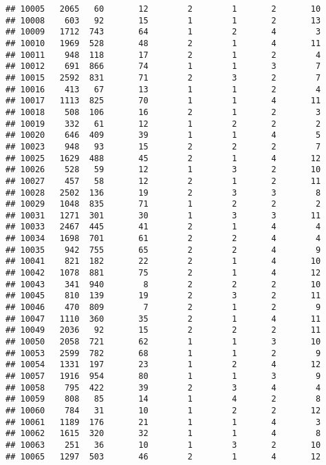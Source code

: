 \documentclass[]{article}
\begin{document}
\begin{verbatim}
## 10005   2065   60       12        2        1       2       10
## 10008    603   92       15        1        1       2       13
## 10009   1712  743       64        1        2       4        3
## 10010   1969  528       48        2        1       4       11
## 10011    948  118       17        2        1       2        4
## 10012    691  866       74        1        1       3        7
## 10015   2592  831       71        2        3       2        7
## 10016    413   67       13        1        1       2        4
## 10017   1113  825       70        1        1       4       11
## 10018    508  106       16        2        1       2        3
## 10019    332   61       12        1        2       2        2
## 10020    646  409       39        1        1       4        5
## 10023    948   93       15        2        2       2        7
## 10025   1629  488       45        2        1       4       12
## 10026    528   59       12        1        3       2       10
## 10027    457   58       12        2        1       2       11
## 10028   2502  136       19        2        3       3        8
## 10029   1048  835       71        1        2       2        2
## 10031   1271  301       30        1        3       3       11
## 10033   2467  445       41        2        1       4        4
## 10034   1698  701       61        2        2       4        4
## 10035    942  755       65        2        2       4        9
## 10041    821  182       22        2        1       4       10
## 10042   1078  881       75        2        1       4       12
## 10043    341  940        8        2        2       2       10
## 10045    810  139       19        2        3       2       11
## 10046    470  809        7        2        1       2        9
## 10047   1110  360       35        2        1       4       11
## 10049   2036   92       15        2        2       2       11
## 10050   2058  721       62        1        1       3       10
## 10053   2599  782       68        1        1       2        9
## 10054   1331  197       23        1        2       4       12
## 10057   1916  954       80        1        1       3        9
## 10058    795  422       39        2        3       4        4
## 10059    808   85       14        1        4       2        8
## 10060    784   31       10        1        2       2       12
## 10061   1189  176       21        1        1       4        3
## 10062   1615  320       32        1        1       4        8
## 10063    251   36       10        1        3       2       10
## 10065   1297  503       46        2        1       4       12

\end{verbatim}
\end{document}

